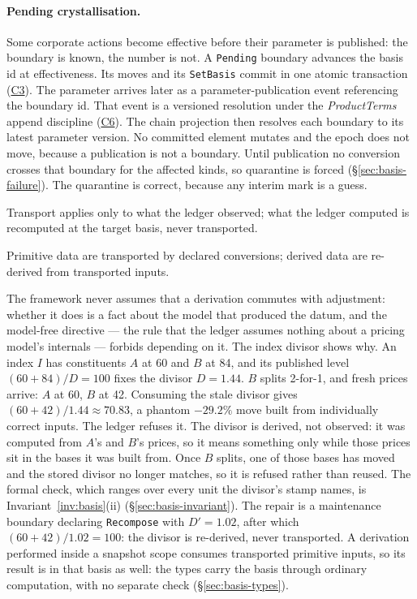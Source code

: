 \paragraph{Pending crystallisation.} Some corporate actions become effective before
their parameter is published: the boundary is known, the number is not. A
\texttt{Pending} boundary advances the basis id at effectiveness. Its moves and
its \texttt{SetBasis} commit in one atomic transaction (\hyperref[cond:C3]{C3}). The
parameter arrives later as a parameter-publication event referencing the boundary id.
That event is a versioned resolution under the \emph{ProductTerms} append discipline
(\hyperref[cond:C6]{C6}). The chain projection then resolves each boundary to its
latest parameter version. No committed element mutates and the epoch does not move,
because a publication is not a boundary. Until publication no conversion crosses that
boundary for the affected kinds, so quarantine is forced (\S\ref{sec:basis-failure}).
The quarantine is correct, because any interim mark is a guess.

Transport applies only to what the ledger observed; what the ledger computed is
recomputed at the target basis, never transported.

\begin{principle}
\label{prin:rederivation}
Primitive data are transported by declared conversions; derived data are re-derived
from transported inputs.
\end{principle}

The framework never assumes that a derivation commutes with adjustment: whether it
does is a fact about the model that produced the datum, and the model-free directive
--- the rule that the ledger assumes nothing about a pricing model's internals ---
forbids depending on it. The index divisor shows why. An index $I$ has constituents
$A$ at 60 and $B$ at 84, and its published level $(60+84)/D=100$ fixes the divisor
$D=1.44$. $B$ splits 2-for-1, and fresh prices arrive: $A$ at 60, $B$ at 42.
Consuming the stale divisor gives $(60+42)/1.44\approx70.83$, a phantom $-29.2\%$ move built
from individually correct inputs. The ledger refuses it. The divisor is derived, not observed: it was computed from
$A$'s and $B$'s prices, so it means something only while those prices sit in the bases
it was built from. Once $B$ splits, one of those bases has moved and the stored divisor
no longer matches, so it is refused rather than reused. The formal check, which ranges
over every unit the divisor's stamp names, is Invariant~\ref{inv:basis}(ii)
(\S\ref{sec:basis-invariant}).
The repair is a maintenance boundary declaring \texttt{Recompose} with $D'=1.02$,
after which $(60+42)/1.02=100$: the divisor is re-derived, never transported. A
derivation performed inside a snapshot scope consumes transported primitive inputs,
so its result is in that basis as well: the types carry the basis through ordinary
computation, with no separate check (\S\ref{sec:basis-types}).

